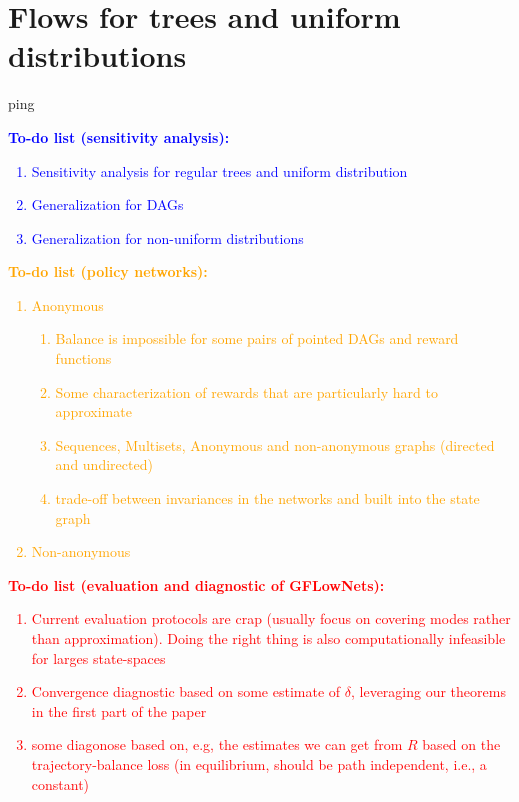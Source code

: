 \section{Flows for trees and uniform distributions}


ping

\textcolor{blue}{
\textbf{To-do list (sensitivity analysis):}
\begin{enumerate}
    \item Sensitivity analysis for regular trees and uniform distribution 
    \item Generalization for DAGs
    \item Generalization for non-uniform distributions
\end{enumerate}
}
\textcolor{orange}{
\textbf{To-do list (policy networks):}
\begin{enumerate}
    \item Anonymous
    \begin{enumerate}
        \item Balance is impossible for some pairs of pointed DAGs and reward functions
        \item Some characterization of rewards that are particularly hard to approximate
        \item Sequences, Multisets, Anonymous and non-anonymous graphs (directed and undirected) 
\item trade-off between invariances in the networks and built into the state graph    \end{enumerate}
    \item Non-anonymous
\end{enumerate}
    }

\textcolor{red}{
\textbf{To-do list (evaluation and diagnostic of GFLowNets):}
\begin{enumerate}
    \item Current evaluation protocols are crap (usually focus on covering modes rather than approximation). Doing the right thing is also computationally infeasible for larges state-spaces 
    \item Convergence diagnostic based on some estimate of $\delta$, leveraging our theorems in the first part of the paper
    \item some diagonose based on, e.g, the estimates we can get from $R$ based on the trajectory-balance loss (in equilibrium, should be path independent, i.e., a constant)
\end{enumerate}
}

